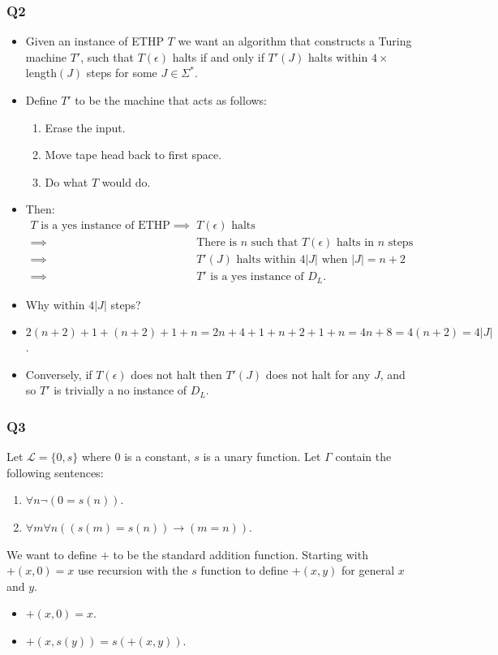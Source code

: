 \documentclass[handout]{beamer}
\newcommand{\ra}{\rightarrow}
\begin{document}
\begin{frame}
\frametitle{Q2}
\begin{itemize}
\item Given an instance of ETHP $T$ we want an algorithm that constructs a Turing machine $T'$, such that $T(\epsilon)$ halts if and only if $T'(J)$ halts within $4\times$length$(J)$ steps for some $J\in \Sigma^*$. 

\item Define $T'$ to be the machine that acts as follows:
\begin{enumerate}
\item Erase the input.
\item Move tape head back to first space. 
\item Do what $T$ would do.
\end{enumerate}
\item Then: 
\scriptsize
\begin{align*}
T\text{ is a yes instance of ETHP} \implies& T(\epsilon)\text{ halts} \\ 
\implies& \text{There is $n$ such that $T(\epsilon)$ halts in $n$ steps}\\
\implies& T'(J)\text{ halts within $4|J|$ when $|J|=n+2$}\\
\implies& T' \text{ is a yes instance of }D_L.
\end{align*}
\item Why within $4|J|$ steps?
\item $2(n+2)+1+(n+2)+1+n = 2n+4+1+n+2+1+n = 4n+8=4(n+2)=4|J|$.
\normalsize
\item Conversely, if $T(\epsilon)$ does not halt then $T'(J)$ does not halt for any $J$, and so $T'$ is trivially a no instance of $D_L$.  
\end{itemize}
\end{frame}

\begin{frame}
\frametitle{Q3}
Let $\mathscr{L}=\{0,s\}$ where $0$ is a constant, $s$ is a unary function. Let $\Gamma$ contain the following sentences:
\begin{enumerate}
\item $\forall n \neg (0 =s(n))$.
\item $\forall m\forall n((s(m)=s(n))\ra (m =n))$.
\end{enumerate}
We want to define $+$ to be the standard addition function. Starting with $+(x,0)=x$ use recursion with the $s$ function to define $+(x,y)$ for general $x$ and $y$.
\vspace{0.5cm}
\begin{itemize}
\item $+(x,0) = x$.
\item $+(x,s(y)) = s(+(x,y))$.
\end{itemize}
\end{frame}
\end{document}
